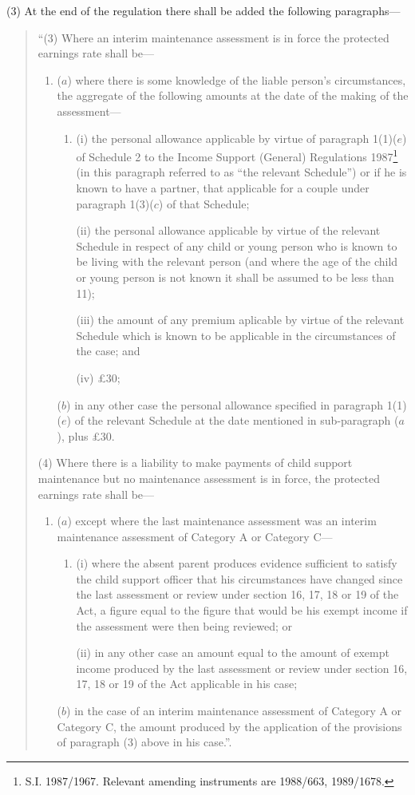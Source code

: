 \documentclass[12pt,a4paper]{article}
\begin{document}
(3) At the end of the regulation there shall be added the following paragraphs—
\begin{quotation}
“(3) Where an interim maintenance assessment is in force the protected earnings rate shall be—
\begin{enumerate}\item[]
($a$) where there is some knowledge of the liable person’s circumstances, the aggregate of the following amounts at the date of the making of the assessment—
\begin{enumerate}\item[]
(i) the personal allowance applicable by virtue of paragraph 1(1)($e$) of Schedule 2 to the Income Support (General) Regulations 1987\footnote{\frenchspacing S.I. 1987/1967. Relevant amending instruments are 1988/663, 1989/1678.} (in this paragraph referred to as “the relevant Schedule”) or if he is known to have a partner, that applicable for a couple under paragraph 1(3)($c$) of that Schedule;

(ii) the personal allowance applicable by virtue of the relevant Schedule in respect of any child or young person who is known to be living with the relevant person (and where the age of the child or young person is not known it shall be assumed to be less than 11);

(iii) the amount of any premium aplicable by virtue of the relevant Schedule which is known to be applicable in the circumstances of the case; and

(iv) £30;
\end{enumerate}

($b$) in any other case the personal allowance specified in paragraph 1(1)($e$) of the relevant Schedule at the date mentioned in sub-paragraph ($a$), plus £30.
\end{enumerate}

(4) Where there is a liability to make payments of child support maintenance but no maintenance assessment is in force, the protected earnings rate shall be—
\begin{enumerate}\item[]
($a$) except where the last maintenance assessment was an interim maintenance assessment of Category A or Category C—
\begin{enumerate}\item[]
(i) where the absent parent produces evidence sufficient to satisfy the child support officer that his circumstances have changed since the last assessment or review under section 16, 17, 18 or 19 of the Act, a figure equal to the figure that would be his exempt income if the assessment were then being reviewed; or

(ii) in any other case an amount equal to the amount of exempt income produced by the last assessment or review under section 16, 17, 18 or 19 of the Act applicable in his case;
\end{enumerate}

($b$) in the case of an interim maintenance assessment of Category A or Category C, the amount produced by the application of the provisions of paragraph (3) above in his case.”.
\end{enumerate}
\end{quotation}
\end{document}
